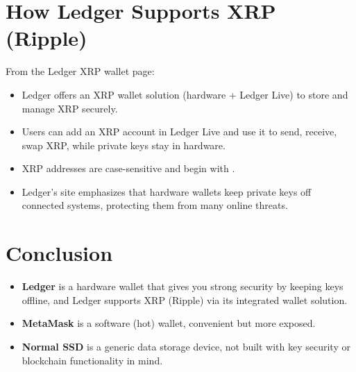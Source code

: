 \documentclass{article}
\begin{document}
\section{How Ledger Supports XRP (Ripple)}

From the Ledger XRP wallet page:

\begin{itemize}
  \item Ledger offers an XRP wallet solution (hardware + Ledger Live) to store and manage XRP securely.
  \item Users can add an XRP account in Ledger Live and use it to send, receive, swap XRP, while private keys stay in hardware. 
  \item XRP addresses are case-sensitive and begin with .
  \item Ledger's site emphasizes that hardware wallets keep private keys off connected systems, protecting them from many online threats. 
\end{itemize}

\section{Conclusion}

\begin{itemize}
  \item \textbf{Ledger} is a hardware wallet that gives you strong security by keeping keys offline, and Ledger supports XRP (Ripple) via its integrated wallet solution.  
  \item \textbf{MetaMask} is a software (hot) wallet, convenient but more exposed.  
  \item \textbf{Normal SSD} is a generic data storage device, not built with key security or blockchain functionality in mind.  
\end{itemize}
\end{document}
